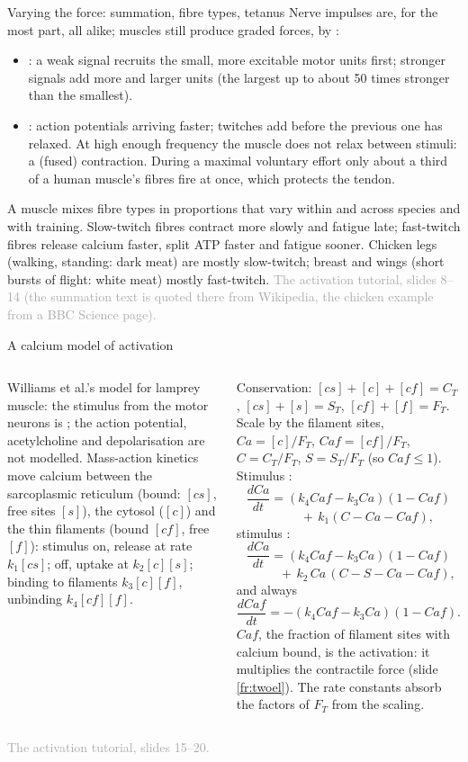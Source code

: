 \documentclass[aspectratio=169,11pt]{beamer}
\newcommand{\sourcecredit}[1]{\vfill\hfill{\tiny\textcolor{DarkGray}{#1}}}
\begin{document}
\begin{frame}{Varying the force: summation, fibre types, tetanus}
\label{fr:summation}
\small
Nerve impulses are, for the most part, all alike; muscles still produce graded forces, by :
\begin{itemize}
  \item {}: a weak signal recruits the small, more excitable motor units first; stronger signals add more and larger units (the largest up to about 50 times stronger than the smallest).
  \item {}: action potentials arriving faster; twitches add before the previous one has relaxed. At high enough frequency the muscle does not relax between stimuli: a  (fused) contraction. During a maximal voluntary effort only about a third of a human muscle's fibres fire at once, which protects the tendon.
\end{itemize}
 A muscle mixes fibre types in proportions that vary within and across species and with training. Slow-twitch fibres contract more slowly and fatigue late; fast-twitch fibres release calcium faster, split ATP faster and fatigue sooner. Chicken legs (walking, standing: dark meat) are mostly slow-twitch; breast and wings (short bursts of flight: white meat) mostly fast-twitch.
\sourcecredit{The activation tutorial, slides 8--14 (the summation text is quoted there from Wikipedia, the chicken example from a BBC Science page).}
\end{frame}

\begin{frame}{A calcium model of activation}
\label{fr:calcium}
\begin{columns}[T]
\footnotesize
Williams et al.'s model for lamprey muscle: the stimulus from the motor neurons is ; the action potential, acetylcholine and depolarisation are not modelled. Mass-action kinetics move calcium between the sarcoplasmic reticulum (bound: $[cs]$, free sites $[s]$), the cytosol ($[c]$) and the thin filaments (bound $[cf]$, free $[f]$): stimulus on, release at rate $k_1[cs]$; off, uptake at $k_2[c][s]$; binding to filaments $k_3[c][f]$, unbinding $k_4[cf][f]$.

Conservation: $[cs] + [c] + [cf] = C_T$, $[cs] + [s] = S_T$, $[cf] + [f] = F_T$. Scale by the filament sites, $Ca = [c]/F_T$, $Caf = [cf]/F_T$, $C = C_T/F_T$, $S = S_T/F_T$ (so $Caf \le 1$).
\footnotesize
Stimulus :
\[ \frac{dCa}{dt} = (k_4 Caf - k_3 Ca)(1 - Caf) \]
\[ \qquad\quad +\, k_1(C - Ca - Caf), \]
stimulus :
\[ \frac{dCa}{dt} = (k_4 Caf - k_3 Ca)(1 - Caf) \]
\[ \qquad\quad +\, k_2\,Ca\,(C - S - Ca - Caf), \]
and always
\[ \frac{dCaf}{dt} = -(k_4 Caf - k_3 Ca)(1 - Caf). \]
$Caf$, the fraction of filament sites with calcium bound, is the activation: it multiplies the contractile force (slide \ref{fr:twoel}). The rate constants absorb the factors of $F_T$ from the scaling.
\end{columns}
\sourcecredit{The activation tutorial, slides 15--20.}
\end{frame}
\end{document}
